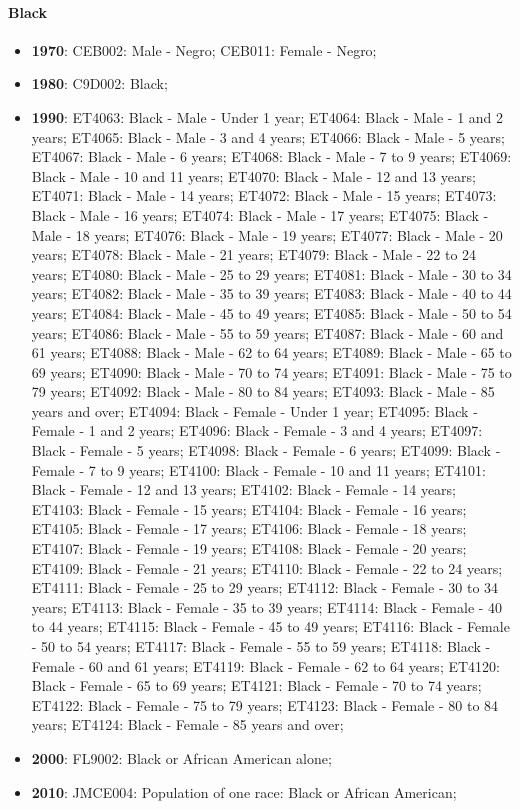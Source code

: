 \documentclass[a4paper]{article}
\begin{document}
\paragraph{Black}
\begin{itemize}
   \item{\textbf{1970}:  CEB002: Male - Negro; CEB011: Female - Negro;}
   \item{\textbf{1980}:  C9D002: Black;}
   \item{\textbf{1990}:  ET4063: Black - Male - Under 1 year; ET4064: Black - Male - 1 and 2 years; ET4065: Black - Male - 3 and 4 years; ET4066: Black - Male - 5 years; ET4067: Black - Male - 6 years; ET4068: Black - Male - 7 to 9 years; ET4069: Black - Male - 10 and 11 years; ET4070: Black - Male - 12 and 13 years; ET4071: Black - Male - 14 years; ET4072: Black - Male - 15 years; ET4073: Black - Male - 16 years; ET4074: Black - Male - 17 years; ET4075: Black - Male - 18 years; ET4076: Black - Male - 19 years; ET4077: Black - Male - 20 years; ET4078: Black - Male - 21 years; ET4079: Black - Male - 22 to 24 years; ET4080: Black - Male - 25 to 29 years; ET4081: Black - Male - 30 to 34 years; ET4082: Black - Male - 35 to 39 years; ET4083: Black - Male - 40 to 44 years; ET4084: Black - Male - 45 to 49 years; ET4085: Black - Male - 50 to 54 years; ET4086: Black - Male - 55 to 59 years; ET4087: Black - Male - 60 and 61 years; ET4088: Black - Male - 62 to 64 years; ET4089: Black - Male - 65 to 69 years; ET4090: Black - Male - 70 to 74 years; ET4091: Black - Male - 75 to 79 years; ET4092: Black - Male - 80 to 84 years; ET4093: Black - Male - 85 years and over; ET4094: Black - Female - Under 1 year; ET4095: Black - Female - 1 and 2 years; ET4096: Black - Female - 3 and 4 years; ET4097: Black - Female - 5 years; ET4098: Black - Female - 6 years; ET4099: Black - Female - 7 to 9 years; ET4100: Black - Female - 10 and 11 years; ET4101: Black - Female - 12 and 13 years; ET4102: Black - Female - 14 years; ET4103: Black - Female - 15 years; ET4104: Black - Female - 16 years; ET4105: Black - Female - 17 years; ET4106: Black - Female - 18 years; ET4107: Black - Female - 19 years; ET4108: Black - Female - 20 years; ET4109: Black - Female - 21 years; ET4110: Black - Female - 22 to 24 years; ET4111: Black - Female - 25 to 29 years; ET4112: Black - Female - 30 to 34 years; ET4113: Black - Female - 35 to 39 years; ET4114: Black - Female - 40 to 44 years; ET4115: Black - Female - 45 to 49 years; ET4116: Black - Female - 50 to 54 years; ET4117: Black - Female - 55 to 59 years; ET4118: Black - Female - 60 and 61 years; ET4119: Black - Female - 62 to 64 years; ET4120: Black - Female - 65 to 69 years; ET4121: Black - Female - 70 to 74 years; ET4122: Black - Female - 75 to 79 years; ET4123: Black - Female - 80 to 84 years; ET4124: Black - Female - 85 years and over;}
   \item{\textbf{2000}:  FL9002: Black or African American alone;}
   \item{\textbf{2010}:  JMCE004: Population of one race: Black or African American;}
\end{itemize}
\end{document}
